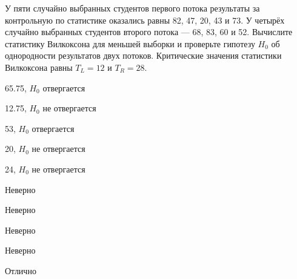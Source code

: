 
\begin{question}
У пяти случайно выбранных студентов первого потока результаты за
контрольную по статистике оказались равны 82, 47, 20, 43 и 73. У четырёх
случайно выбранных студентов второго потока — 68, 83, 60 и 52.
Вычислите статистику Вилкоксона для меньшей выборки и проверьте гипотезу
\(H_0\) об однородности результатов двух потоков. Критические значения
статистики Вилкоксона равны \(T_L=12\) и \(T_R=28\).
\begin{answerlist}
  \item 65.75, \(H_0\) отвергается
  \item 12.75, \(H_0\) не отвергается
  \item 53, \(H_0\) отвергается
  \item 20, \(H_0\) не отвергается
  \item 24, \(H_0\) не отвергается
\end{answerlist}
\end{question}

\begin{solution}
\begin{answerlist}
  \item Неверно
  \item Неверно
  \item Неверно
  \item Неверно
  \item Отлично
\end{answerlist}
\end{solution}

